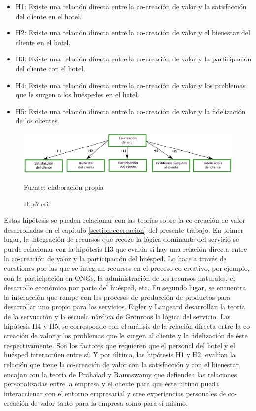 \begin{itemize}
\item H1: Existe una relación directa entre la co-creación de valor y la satisfacción del cliente en el hotel.

\item H2: Existe una relación directa entre la co-creación de valor y el bienestar del cliente en el hotel.

\item H3: Existe una relación directa entre la co-creación de valor y la participación del cliente con el hotel.

\item H4: Existe una relación directa entre la co-creación de valor y los problemas que le surgen a los huéspedes en el hotel.

\item H5: Existe una relación directa entre la co-creación de valor y la fidelización de los clientes.
\end{itemize}

\begin{figure}[!h]
	\caption{Hipótesis}
	\centering \includegraphics[width=150mm]{capitulos/graficos/hipotesis} 
	\label{fig:hipotesis} 
	
		\footnotesize
		Fuente: elaboración propia
\end{figure}

Estas hipótesis se pueden relacionar con las teorías sobre la co-creación de valor desarrolladas en el capítulo \ref{section:cocreacion} del presente trabajo. En primer lugar, la integración de recursos que recoge la lógica dominante del servicio se puede relacionar con la hipótesis H3 que evalúa si hay una relación directa entre la co-creación de valor y la participación del huésped. Lo hace a través de cuestiones por las que se integran recursos en el proceso co-creativo, por ejemplo, con la participación en ONGs, la administración de los recursos naturales, el desarrollo económico por parte del huésped, etc. En segundo lugar, se encuentra la interacción que rompe con los procesos de producción de productos para desarrollar uno propio para los servicios. Eigler y Langeard desarrollan la teoría de la servucción y la escuela nórdica de Grönroos la lógica del servicio. Las hipótesis H4 y H5, se corresponde con el análisis de la relación directa entre la co-creación de valor y los problemas que le surgen al cliente y la fidelización de éste respectivamente. Son los factores que requieren que el personal del hotel y el huésped interactúen entre sí. Y por último, las hipótesis H1 y H2, evalúan la relación que tiene la co-creación de valor con la satisfacción y con el bienestar, encajan con la teoría de Prahalad y Ramaswamy que defienden las relaciones personalizadas entre la empresa y el cliente para que éste último pueda interaccionar con el entorno empresarial y cree experiencias personales de co-creación de valor tanto para la empresa como para sí mismo. 

